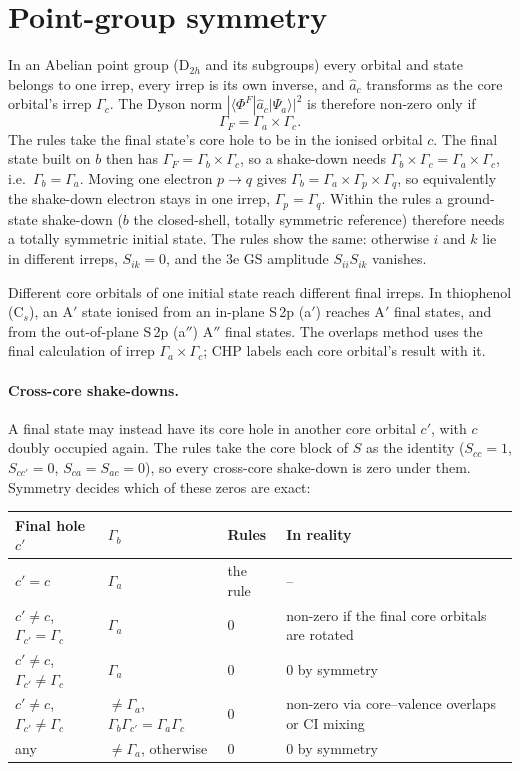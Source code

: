 \documentclass[11pt]{article}
\begin{document}
\section{Point-group symmetry}

In an Abelian point group (D$_{2h}$ and its subgroups) every orbital and state belongs to one
irrep, every irrep is its own inverse, and $\hat a_c$ transforms as the core orbital's irrep
$\Gamma_c$. The Dyson norm $|\langle\Phi^F|\hat a_c|\Psi_a\rangle|^2$ is therefore non-zero only if
\[
  \Gamma_F=\Gamma_a\times\Gamma_c .
\]
The rules take the final state's core hole to be in the ionised orbital $c$. The final state
built on $b$ then has $\Gamma_F=\Gamma_b\times\Gamma_c$, so a shake-down needs
$\Gamma_b\times\Gamma_c=\Gamma_a\times\Gamma_c$, i.e.\ $\Gamma_b=\Gamma_a$. Moving one
electron $p\to q$ gives $\Gamma_b=\Gamma_a\times\Gamma_p\times\Gamma_q$, so equivalently the
shake-down electron stays in one irrep, $\Gamma_p=\Gamma_q$. Within the rules a ground-state
shake-down ($b$ the closed-shell, totally symmetric reference) therefore needs a totally
symmetric initial state. The rules show the same: otherwise $i$ and $k$ lie in different irreps,
$S_{ik}=0$, and the 3e GS amplitude $S_{ii}S_{ik}$ vanishes.

Different core orbitals of one initial state reach different final irreps. In thiophenol
(C$_s$), an A$'$ state ionised from an in-plane S\,2p (a$'$) reaches A$'$ final states, and from
the out-of-plane S\,2p (a$''$) A$''$ final states. The overlaps method uses the final
calculation of irrep $\Gamma_a\times\Gamma_c$; CHP labels each core orbital's result with it.

\paragraph{Cross-core shake-downs.} A final state may instead have its core hole in another core
orbital $c'$, with $c$ doubly occupied again. The rules take the core block of $S$ as the identity
($S_{cc}=1$, $S_{cc'}=0$, $S_{ca}=S_{ac}=0$), so every cross-core shake-down is zero under them.
Symmetry decides which of these zeros are exact:

\begin{center}
\small
\begin{tabular}{@{}llll@{}}
\toprule
Final hole $c'$ & $\Gamma_b$ & Rules & In reality \\
\midrule
$c'=c$ & $\Gamma_a$ & the rule & -- \\
$c'\ne c$, $\Gamma_{c'}=\Gamma_c$ & $\Gamma_a$ & 0 & non-zero if the final core orbitals are rotated \\
$c'\ne c$, $\Gamma_{c'}\ne\Gamma_c$ & $\Gamma_a$ & 0 & 0 by symmetry \\
$c'\ne c$, $\Gamma_{c'}\ne\Gamma_c$ & $\ne\Gamma_a$, $\Gamma_b\Gamma_{c'}=\Gamma_a\Gamma_c$ & 0 & non-zero via core--valence overlaps or CI mixing \\
any & $\ne\Gamma_a$, otherwise & 0 & 0 by symmetry \\
\bottomrule
\end{tabular}
\end{center}
\end{document}
